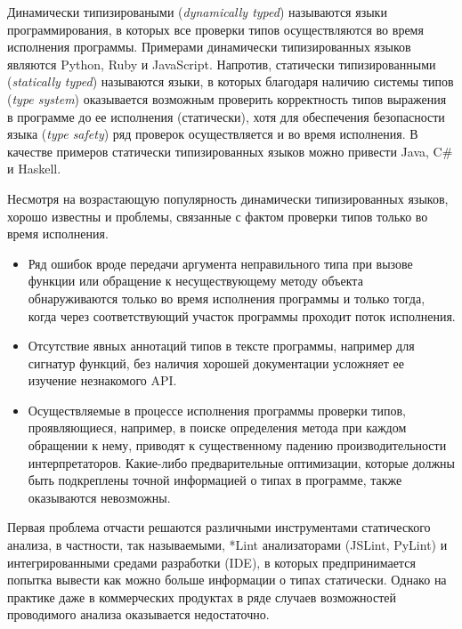 \intro

Динамически типизироваными (\emph{dynamically typed}) называются языки
программирования, в которых все проверки типов осуществляются во время
исполнения программы. Примерами динамически типизированных языков являются
Python, Ruby и JavaScript.  Напротив, статически типизированными
(\emph{statically typed}) называются языки, в которых благодаря наличию системы
типов (\emph{type system}) оказывается возможным проверить корректность типов
выражения в программе до ее исполнения (статически), хотя для обеспечения
безопасности языка (\emph{type safety}) ряд проверок осуществляется и во время
исполнения.  В качестве примеров статически типизированных языков можно привести
Java, C\# и Haskell.

Несмотря на возрастающую популярность динамически типизированных языков,
хорошо известны и проблемы, связанные с фактом проверки типов только во время
исполнения.

\begin{itemize}
  \item{%
      Ряд ошибок вроде передачи аргумента неправильного типа при вызове
      функции или обращение к несуществующему методу объекта обнаруживаются
      только во время исполнения программы и только тогда, когда через
      соответствующий участок программы проходит поток исполнения.
    }
  \item{%
      Отсутствие явных аннотаций типов в тексте программы, например для сигнатур
      функций, без наличия хорошей документации усложняет ее изучение
      незнакомого API.
    }
  \item{%
      Осуществляемые в процессе исполнения программы проверки типов,
      проявляющиеся, например, в поиске определения метода при каждом обращении
      к нему, приводят к существенному падению производительности
      интерпретаторов. Какие-либо предварительные оптимизации, которые
      должны быть подкреплены точной информацией о типах в программе, также
      оказываются невозможны. 
    }
\end{itemize}

Первая проблема отчасти решаются различными инструментами статического
анализа, в частности, так называемыми, *Lint анализаторами (JSLint, PyLint) и
интегрированными средами разработки (IDE), в которых предпринимается попытка
вывести как можно больше информации о типах статически.  Однако на практике даже
в коммерческих продуктах в ряде случаев возможностей проводимого анализа
оказывается недостаточно.

